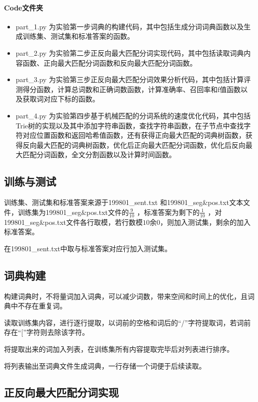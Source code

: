 \documentclass[11pt,a4paper]{article}
\begin{document}
	\paragraph{Code文件夹}
	\begin{itemize}
		\item part\_1.py 为实验第一步词典的构建代码，其中包括生成分词词典函数以及生成训练集、测试集和标准答案的函数。
		\item part\_2.py 为实验第二步正反向最大匹配分词实现代码，其中包括读取词典内容函数、正向最大匹配分词函数和反向最大匹配分词函数。
		\item part\_3.py 为实验第三步正反向最大匹配分词效果分析代码，其中包括计算评测得分函数，计算总词数和正确词数函数，计算准确率、召回率和f值函数以及获取词对应下标的函数。
		\item part\_4.py 为实验第四步基于机械匹配的分词系统的速度优化代码，其中包括Trie树的实现以及其中添加字符串函数，查找字符串函数，在子节点中查找字符对应位置函数和返回哈希值函数，还有获得正向最大匹配的词典树函数，获得反向最大匹配的词典树函数，优化后正向最大匹配分词函数，优化后反向最大匹配分词函数，全文分割函数以及计算时间函数。
	\end{itemize}
	
	\subsection{训练与测试}
	训练集、测试集和标准答案来源于199801\_sent.txt 和199801\_seg\&pos.txt文本文件，训练集为199801\_seg\&pos.txt文件的$\frac{9}{10}$ ，标准答案为剩下的$\frac{1}{10}$ ，对199801\_seg\&pos.txt文件各行取模，若行数模$10$余$0$，则加入测试集，剩余的加入标准答案。
	
	在199801\_sent.txt中取与标准答案对应行加入测试集。
	
	\subsection{词典构建}
	构建词典时，不将量词加入词典，可以减少词数，带来空间和时间上的优化，且词典中不存在重复词。
	
	读取训练集内容，进行逐行提取，以词前的空格和词后的“/”字符提取词，若词前存在“[”字符则去除该字符。
	
	将提取出来的词加入列表，在训练集所有内容提取完毕后对列表进行排序。
	
	将列表输出至词典文件生成词典，一行存储一个词便于后续读取。
	
	\subsection{正反向最大匹配分词实现}
\end{document}
